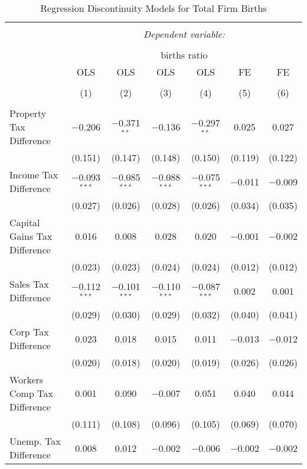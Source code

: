 
\begin{table}[!htbp] \centering 
  \caption{Regression Discontinuity Models for  Total Firm Births} 
  \label{--rd} 
\begin{tabular}{@{\extracolsep{5pt}}lcccccc} 
\\[-1.8ex]\hline 
\hline \\[-1.8ex] 
 & \multicolumn{6}{c}{\textit{Dependent variable:}} \\ 
\cline{2-7} 
\\[-1.8ex] & \multicolumn{6}{c}{births ratio} \\ 
 & OLS & OLS & OLS & OLS & FE & FE \\ 
\\[-1.8ex] & (1) & (2) & (3) & (4) & (5) & (6)\\ 
\hline \\[-1.8ex] 
 Property Tax Difference & $-$0.206 & $-$0.371$^{**}$ & $-$0.136 & $-$0.297$^{**}$ & 0.025 & 0.027 \\ 
  & (0.151) & (0.147) & (0.148) & (0.150) & (0.119) & (0.122) \\ 
  Income Tax Difference & $-$0.093$^{***}$ & $-$0.085$^{***}$ & $-$0.088$^{***}$ & $-$0.075$^{***}$ & $-$0.011 & $-$0.009 \\ 
  & (0.027) & (0.026) & (0.028) & (0.026) & (0.034) & (0.035) \\ 
  Capital Gains Tax Difference & 0.016 & 0.008 & 0.028 & 0.020 & $-$0.001 & $-$0.002 \\ 
  & (0.023) & (0.023) & (0.024) & (0.024) & (0.012) & (0.012) \\ 
  Sales Tax Difference & $-$0.112$^{***}$ & $-$0.101$^{***}$ & $-$0.110$^{***}$ & $-$0.087$^{***}$ & 0.002 & 0.001 \\ 
  & (0.029) & (0.030) & (0.029) & (0.032) & (0.040) & (0.041) \\ 
  Corp Tax Difference & 0.023 & 0.018 & 0.015 & 0.011 & $-$0.013 & $-$0.012 \\ 
  & (0.020) & (0.018) & (0.020) & (0.019) & (0.026) & (0.026) \\ 
  Workers Comp Tax Difference & 0.001 & 0.090 & $-$0.007 & 0.051 & 0.040 & 0.044 \\ 
  & (0.111) & (0.108) & (0.096) & (0.105) & (0.069) & (0.070) \\ 
  Unemp. Tax Difference & 0.008 & 0.012 & $-$0.002 & $-$0.006 & $-$0.002 & $-$0.002 \\ 

\end{tabular}
\end{table}
